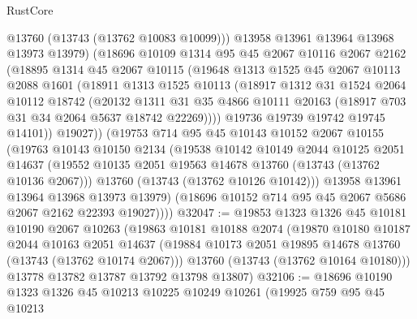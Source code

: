 \begin{lexlean}{RustCore}
\begin{coremodule}
              @13760
              (@13743 (@13762 @10083 @10099)))
            @13958
            @13961
            @13964
            @13968
            @13973
            @13979)
          (@18696
            @10109
            @1314
            @95
            @45
            @2067
            @10116
            @2067
            @2162
            (@18895
              @1314
              @45
              @2067
              @10115
              (@19648
                @1313
                @1525
                @45
                @2067
                @10113
                @2088
                @1601
                (@18911
                  @1313
                  @1525
                  @10113
                  (@18917
                    @1312
                    @31
                    @1524
                    @2064
                    @10112
                    @18742
                    (@20132
                      @1311
                      @31
                      @35
                      @4866
                      @10111
                      @20163
                      (@18917 @703 @31 @34 @2064 @5637 @18742 @22269))))
                @19736
                @19739
                @19742
                @19745
                @14101))
            @19027))
        (@19753
          @714
          @95
          @45
          @10143
          @10152
          @2067
          @10155
          (@19763
            @10143
            @10150
            @2134
            (@19538
              @10142
              @10149
              @2044
              @10125
              @2051
              @14637
              (@19552 @10135 @2051 @19563 @14678 @13760 (@13743 (@13762 @10136 @2067)))
              @13760
              (@13743 (@13762 @10126 @10142)))
            @13958
            @13961
            @13964
            @13968
            @13973
            @13979)
          (@18696 @10152 @714 @95 @45 @2067 @5686 @2067 @2162 @22393 @19027))))
@32047 := @19853
    @1323
    @1326
    @45
    @10181
    @10190
    @2067
    @10263
    (@19863
      @10181
      @10188
      @2074
      (@19870
        @10180
        @10187
        @2044
        @10163
        @2051
        @14637
        (@19884 @10173 @2051 @19895 @14678 @13760 (@13743 (@13762 @10174 @2067)))
        @13760
        (@13743 (@13762 @10164 @10180)))
      @13778
      @13782
      @13787
      @13792
      @13798
      @13807)
@32106 := @18696
    @10190
    @1323
    @1326
    @45
    @10213
    @10225
    @10249
    @10261
    (@19925
      @759
      @95
      @45
      @10213

\end{coremodule}
\end{lexlean}
